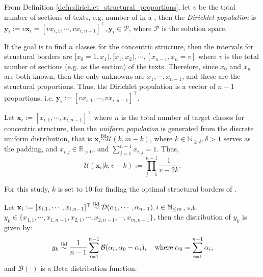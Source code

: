 \begin{defn}
    From Definition \ref{defn:dirichlet_structural_proportions}, let $v$ be the total number of sections of texts, e.g. number of   in a  , then the \textit{Dirichlet population} is $\mathbf{y}_i:=v\mathbf{x}_i=[vx_{i,1},\cdots,vx_{i,n-1}]^{\top},\mathbf{y}_i\in\mathscr{P}$, where $\mathscr{P}$ is the solution space.
\end{defn}
\begin{remark}
    If the goal is to find $n$ classes for the concentric structure, then the intervals for structural borders are $[x_0=1,x_1),[x_1,x_2),\cdots,[x_{n-1},x_n=v]$ where $v$ is the total number of sections (e.g.  \textnormal{} as the section) of the texts. Therefore, since $x_0$ and $x_n$ are both known, then the only unknowns are $x_1,\cdots,x_{n-1}$, and these are the structural proportions. Thus, the Dirichlet population is a vector of $n-1$ proportions, i.e. $\mathbf{y}_i:=[vx_{i,1},\cdots,vx_{i,n-1}]^{\top}$.
\end{remark}
\begin{defn}
    Let $\mathbf{x}_i:=[x_{i,1},\cdots,x_{i,n-1}]^{\top}$ where $n$ is the total number of target classes for concentric structure, then the \textit{uniform population} is generated from the discrete uniform distribution, that is $\mathbf{x}_i\overset{\text{iid}}{\sim}\mathcal{U}(k,m-k)$, where $k\in\mathbb{N}_{\geq \delta},\delta>1$ serves as the padding, and $x_{i,j}\in\mathbb{R}_{>0}$, and $\sum_{j=1}^{n-1}x_{i,j}=1$. Thus,
    \begin{equation}
        \mathcal{U}(\mathbf{x}_i|k,v-k):=\prod_{j=1}^{n-1}\frac{1}{v-2k}.
    \end{equation}
\end{defn}
\begin{remark}
    For this study, $k$ is set to 10 for finding the optimal structural borders of  \textnormal{}.
\end{remark}
\begin{prop}\label{prop:mixture_beta}
    Let $\mathbf{x}_i:=[x_{i,1},\cdots,x_{i,n-1}]^{\top}\overset{\textnormal{iid}}{\sim}\mathcal{D}(\alpha_1,\cdots,\alpha_{n-1}),i\in\mathbb{N}_{\leq m}$, s.t. $y_k\in\{x_{1,1},\cdots,x_{1,n-1},x_{2,1},\cdots,x_{2,n-1},\cdots,x_{m,n-1}\}$, then the distribution of $y_k$ is given by:
\begin{equation}
y_k\overset{\textnormal{iid}}{\sim}\frac{1}{n-1}\sum_{i=1}^{n-1}\mathcal{B}(\alpha_i,\alpha_0-\alpha_i),\quad\text{where}\;\alpha_0=\sum_{i=1}^{n-1}\alpha_i,
\end{equation}
and $\mathcal{B}(\cdot)$ is a Beta distribution function.
\end{prop}
